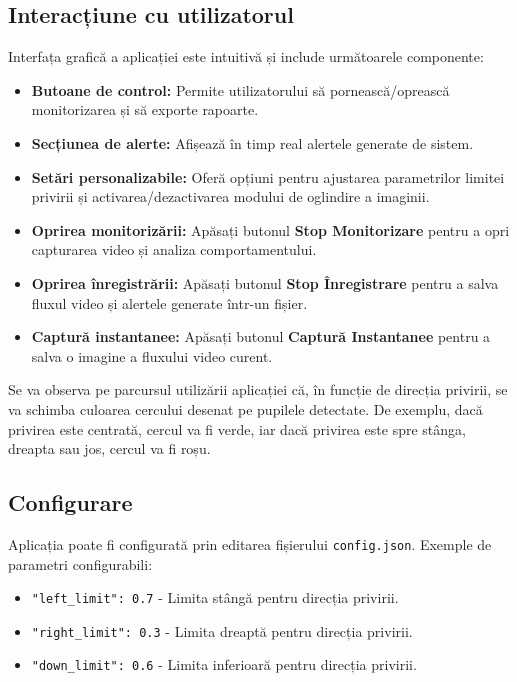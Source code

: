 \documentclass[12pt,a4paper]{article}
\begin{document}
\subsection{Interacțiune cu utilizatorul}

Interfața grafică a aplicației este intuitivă și include următoarele componente:
\begin{itemize}
    \item \textbf{Butoane de control:} Permite utilizatorului să pornească/oprească monitorizarea și să exporte rapoarte.
    \item \textbf{Secțiunea de alerte:} Afișează în timp real alertele generate de sistem.
    \item \textbf{Setări personalizabile:} Oferă opțiuni pentru ajustarea parametrilor limitei privirii și activarea/dezactivarea modului de oglindire a imaginii.
    \item \textbf{Oprirea monitorizării:} Apăsați butonul \textbf{Stop Monitorizare} pentru a opri capturarea video și analiza comportamentului.
    \item \textbf{Oprirea înregistrării:} Apăsați butonul \textbf{Stop Înregistrare} pentru a salva fluxul video și alertele generate într-un fișier.
    \item \textbf{Captură instantanee:} Apăsați butonul \textbf{Captură Instantanee} pentru a salva o imagine a fluxului video curent.
\end{itemize}

Se va observa pe parcursul utilizării aplicației că, în funcție de direcția privirii, se va schimba culoarea cercului desenat pe pupilele detectate. De exemplu, dacă privirea este centrată, cercul va fi verde, iar dacă privirea este spre stânga, dreapta sau jos, cercul va fi roșu.

\subsection{Configurare}

Aplicația poate fi configurată prin editarea fișierului \texttt{config.json}. Exemple de parametri configurabili:
\begin{itemize}
    \item \texttt{"left\_limit": 0.7} - Limita stângă pentru direcția privirii.
    \item \texttt{"right\_limit": 0.3} - Limita dreaptă pentru direcția privirii.
    \item \texttt{"down\_limit": 0.6} - Limita inferioară pentru direcția privirii.
\end{itemize}
\end{document}
